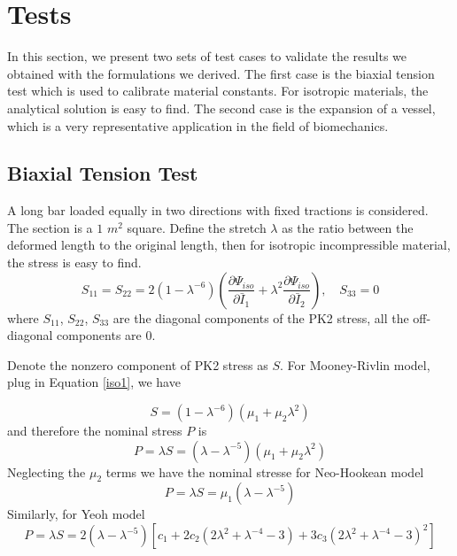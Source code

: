 \section{Tests}
In this section, we present two sets of test cases to validate the results we obtained with the formulations we derived. The first case is the biaxial tension test which is used to calibrate material constants. For isotropic materials, the analytical solution is easy to find. The second case is the expansion of a vessel, which is a very representative application in the field of biomechanics.  

\subsection{Biaxial Tension Test}
A long bar loaded equally in two directions with fixed tractions is considered. The section is a $1$ $m^2$ square. Define the stretch $\lambda$ as the ratio between the deformed length to the original length, then for isotropic incompressible material, the stress is easy to find.
\begin{equation}
S_{11} = S_{22} = 2(1 - {\lambda}^{-6})(\frac{\partial\Psi_{iso}}{\partial\bar{I}_1} + {\lambda}^2\frac{\partial\Psi_{iso}}{\partial\bar{I}_2}), \quad S_{33} = 0
\end{equation}
where $S_{11}$, $S_{22}$, $S_{33}$ are the diagonal components of the PK2 stress, all the off-diagonal components are $0$.

Denote the nonzero component of PK2 stress as $S$. For Mooney-Rivlin model, plug in Equation \ref{iso1}, we have

\begin{equation}
S = (1 - {\lambda}^{-6})(\mu_1 + \mu_2{\lambda}^2)
\end{equation}
and therefore the nominal stress $P$ is
\begin{equation}
P = \lambda S =  (\lambda - {\lambda}^{-5})(\mu_1 + \mu_2{\lambda}^2)
\end{equation}
Neglecting the $\mu_2$ terms we have the nominal stresse for Neo-Hookean model
\begin{equation}
P = \lambda S =  \mu_1(\lambda - {\lambda}^{-5})
\end{equation}
Similarly, for Yeoh model
\begin{equation}
P = \lambda S = 2(\lambda - {\lambda}^{-5})[c_1 + 2c_2(2{\lambda}^2 + {\lambda}^{-4} - 3) + 3c_3(2{\lambda}^2 + {\lambda}^{-4} - 3)^2]
\end{equation}

